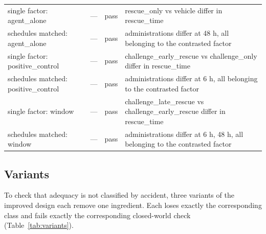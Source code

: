 \documentclass[10pt,a4paper]{article}
\begin{document}
\begin{table}[tbp]
\begin{tabularx}{\linewidth}{@{}p{4.4cm}p{1.2cm}p{1.2cm}X@{}}
single factor: agent\_\allowbreak{}alone & --- & \textcolor{green!45!black}{pass} & rescue\_\allowbreak{}only vs vehicle differ in rescue\_\allowbreak{}time \\
schedules matched: agent\_\allowbreak{}alone & --- & \textcolor{green!45!black}{pass} & administrations differ at 48 h, all belonging to the contrasted factor \\
single factor: positive\_\allowbreak{}control & --- & \textcolor{green!45!black}{pass} & challenge\_\allowbreak{}early\_\allowbreak{}rescue vs challenge\_\allowbreak{}only differ in rescue\_\allowbreak{}time \\
schedules matched: positive\_\allowbreak{}control & --- & \textcolor{green!45!black}{pass} & administrations differ at 6 h, all belonging to the contrasted factor \\
single factor: window & --- & \textcolor{green!45!black}{pass} & challenge\_\allowbreak{}late\_\allowbreak{}rescue vs challenge\_\allowbreak{}early\_\allowbreak{}rescue differ in rescue\_\allowbreak{}time \\
schedules matched: window & --- & \textcolor{green!45!black}{pass} & administrations differ at 6 h, 48 h, all belonging to the contrasted factor \\
\bottomrule\end{tabularx}\end{table}


\subsection{Variants}
To check that adequacy is not classified by accident, three variants of the improved design each remove one
ingredient. Each loses exactly the corresponding class and fails exactly the corresponding closed-world check
(Table~\ref{tab:variants}).
\end{document}
